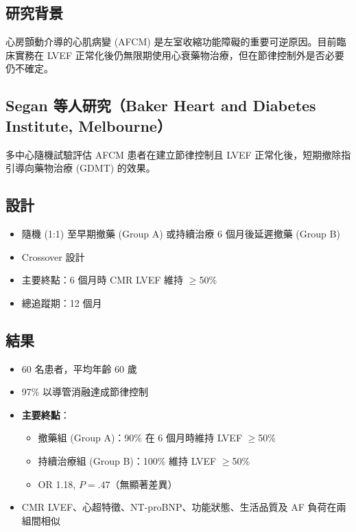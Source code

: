 \documentclass[12pt,a4paper]{article}
\begin{document}
\subsection{研究背景}

心房顫動介導的心肌病變 (AFCM) 是左室收縮功能障礙的重要可逆原因。目前臨床實務在 LVEF 正常化後仍無限期使用心衰藥物治療，但在節律控制外是否必要仍不確定。

\subsection{Segan 等人研究（Baker Heart and Diabetes Institute, Melbourne）}

多中心隨機試驗評估 AFCM 患者在建立節律控制且 LVEF 正常化後，短期撤除指引導向藥物治療 (GDMT) 的效果。

\subsection{設計}
\begin{itemize}
    \item 隨機 (1:1) 至早期撤藥 (Group A) 或持續治療 6 個月後延遲撤藥 (Group B)
    \item Crossover 設計
    \item 主要終點：6 個月時 CMR LVEF 維持 $\geq$50\%
    \item 總追蹤期：12 個月
\end{itemize}

\subsection{結果}

\begin{itemize}
    \item 60 名患者，平均年齡 60 歲
    \item 97\% 以導管消融達成節律控制
    \item \textbf{主要終點}：
    \begin{itemize}
        \item 撤藥組 (Group A)：90\% 在 6 個月時維持 LVEF $\geq$50\%
        \item 持續治療組 (Group B)：100\% 維持 LVEF $\geq$50\%
        \item OR 1.18, $P = .47$（無顯著差異）
    \end{itemize}
    \item CMR LVEF、心超特徵、NT-proBNP、功能狀態、生活品質及 AF 負荷在兩組間相似
\end{itemize}
\end{document}
